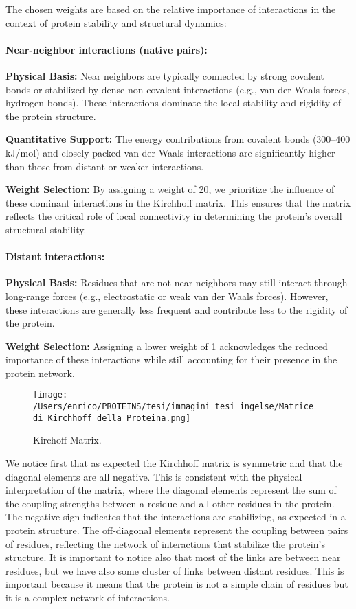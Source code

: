 \documentclass[English, Lau, oneside]{sapthesis}
\begin{document}
\begin{itemize}
The chosen weights are based on the relative importance of interactions in the context of protein stability and structural dynamics:

\paragraph{Near-neighbor interactions (native pairs):}
\textbf{Physical Basis:} Near neighbors are typically connected by strong covalent bonds or stabilized by dense non-covalent interactions (e.g., van der Waals forces, hydrogen bonds). These interactions dominate the local stability and rigidity of the protein structure.

\textbf{Quantitative Support:} The energy contributions from covalent bonds (300–400 kJ/mol) and closely packed van der Waals interactions are significantly higher than those from distant or weaker interactions.

\textbf{Weight Selection:} By assigning a weight of 20, we prioritize the influence of these dominant interactions in the Kirchhoff matrix. This ensures that the matrix reflects the critical role of local connectivity in determining the protein's overall structural stability.

\paragraph{Distant interactions:}
\textbf{Physical Basis:} Residues that are not near neighbors may still interact through long-range forces (e.g., electrostatic or weak van der Waals forces). However, these interactions are generally less frequent and contribute less to the rigidity of the protein.

\textbf{Weight Selection:} Assigning a lower weight of 1 acknowledges the reduced importance of these interactions while still accounting for their presence in the protein network.
\begin{figure}[h!]
    \centering
    \texttt{[image: /Users/enrico/PROTEINS/tesi/immagini\_tesi\_ingelse/Matrice di Kirchhoff della Proteina.png]}
    \caption{Kirchoff Matrix.}
\end{figure}
We notice first that as expected the Kirchhoff matrix is symmetric and that the diagonal elements are all negative. This is consistent with the physical interpretation of the matrix, where the diagonal elements represent the sum of the coupling strengths between a residue and all other residues in the protein. The negative sign indicates that the interactions are stabilizing, as expected in a protein structure. The off-diagonal elements represent the coupling between pairs of residues, reflecting the network of interactions that stabilize the protein's structure.
It is important to notice also that most of the links are between near residues, but we have also some cluster of links between distant residues. This is important because it means that the protein is not a simple chain of residues but it is a complex network of interactions.


\end{itemize}
\end{document}
